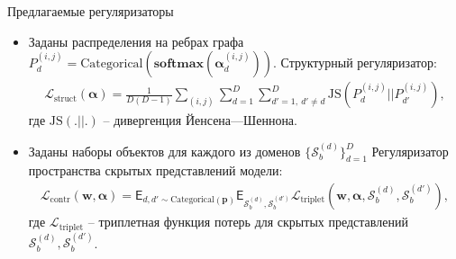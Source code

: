 \documentclass[aspectratio=169]{beamer}
\def\balpha{\boldsymbol{\alpha}}
\begin{document}
\begin{frame}{Предлагаемые регуляризаторы}
\begin{itemize}
\item Заданы распределения на ребрах графа
$P_d^{(i, j)} = \mathrm{Categorical}(\mathbf{softmax}(\balpha^{(i, j)}_d))$. Структурный
регуляризатор:
\begin{align*}
  \mathcal{L}_\text{struct}(\boldsymbol\alpha) = \frac{1}{D(D-1)}\sum_{(i, j)}
  \sum_{d=1}^D\sum_{d'=1, ~d' \not= d}^D\mathrm{JS}(P_d^{(i, j)}||P_{d'}^{(i, j)}),
\end{align*}
где $\mathrm{JS}(.||.)$ -- дивергенция Йенсена—Шеннона.
\item Заданы наборы объектов для каждого из доменов $\{\mathcal{S}_b^{(d)}\}_{d=1}^D$
Регуляризатор пространства скрытых представлений модели:
\begin{align*}
  \mathcal{L}_\text{contr}(\mathbf{w}, \boldsymbol\alpha) = \mathsf{E}_{d, d' \sim \mathrm{Categorical}(\mathbf{p})}
  \mathsf{E}_{\mathcal{S}_b^{(d)}, \mathcal{S}_b^{(d')}}\mathcal{L}_\text{triplet}
  (\mathbf{w}, \boldsymbol\alpha, \mathcal{S}_b^{(d)}, \mathcal{S}_b^{(d')}),
\end{align*}
где $\mathcal{L}_\text{triplet}$ -- триплетная функция потерь для скрытых представлений 
$\mathcal{S}_b^{(d)}, \mathcal{S}_b^{(d')}$.

\end{itemize}
\end{frame}
\end{document}
